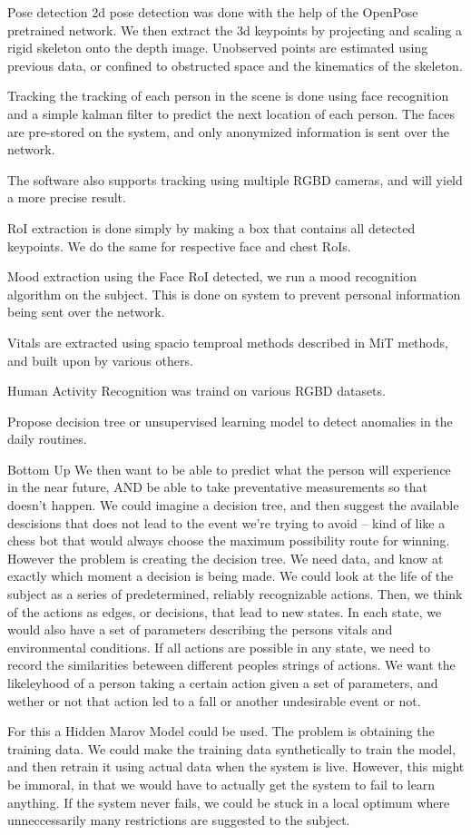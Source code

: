 Pose detection 2d pose detection was done with the help of the OpenPose pretrained network. We then extract the 3d keypoints by projecting and scaling a rigid skeleton onto the depth image. Unobserved points are estimated using previous data, or confined to obstructed space and the kinematics of the skeleton.

Tracking the tracking of each person in the scene is done using face recognition and a simple kalman filter to predict the next location of each person. The faces are pre-stored on the system, and only anonymized information is sent over the network.

The software also supports tracking using multiple RGBD cameras, and will yield a more precise result. 

RoI extraction is done simply by making a box that contains all detected keypoints. We do the same for respective face and chest RoIs.

Mood extraction using the Face RoI detected, we run a mood recognition algorithm on the subject. This is done on system to prevent personal information being sent over the network.

Vitals are extracted using spacio temproal methods described in MiT methods, and built upon by various others.

Human Activity Recognition was traind on various RGBD datasets.

Propose decision tree or unsupervised learning model to detect anomalies in the daily routines.

Bottom Up
We then want to be able to predict what the person will experience in the near future, AND be able to take preventative measurements so that doesn't happen.
We could imagine a decision tree, and then suggest the available descisions that does not lead to the event we're trying to avoid -- kind of like a chess bot that would always choose the maximum possibility route for winning. However the problem is creating the decision tree. We need data, and know at exactly which moment a decision is being made.
We could look at the life of the subject as a series of predetermined, reliably recognizable actions. Then, we think of the actions as edges, or decisions, that lead to new states. In each state, we would also have a set of parameters describing the persons vitals and environmental conditions. If all actions are possible in any state, we need to record the similarities beteween different peoples strings of actions. We want the likeleyhood of a person taking a certain action given a set of parameters, and wether or not that action led to a fall or another undesirable event or not.

For this a Hidden Marov Model could be used. The problem is obtaining the training data.
We could make the training data synthetically to train the model, and then retrain it using actual data when the system is live. However, this might be immoral, in that we would have to actually get the system to fail to learn anything. If the system never fails, we could be stuck in a local optimum where unneccessarily many restrictions are suggested to the subject.


